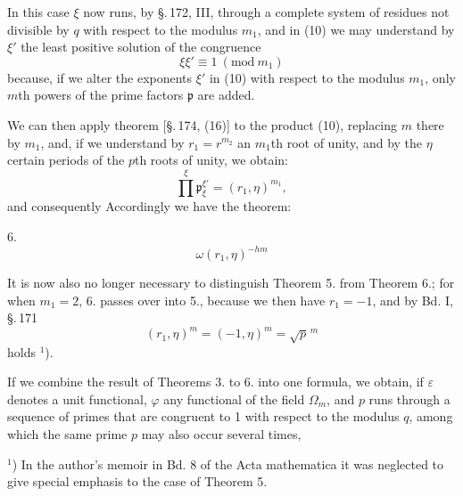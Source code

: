 
In this case $\xi$ now runs, by \S.\,172, III, through a complete
system of residues not divisible by $q$ with respect to the modulus
$m_1$, and in (10) we may understand by $\xi'$ the least positive
solution of the congruence
\[
\xi\xi' \equiv 1\ (\mathrm{mod}\ m_1)
\]
because, if we alter the exponents $\xi'$ in (10) with respect to the
modulus $m_1$, only $m$th powers of the prime factors $\mathfrak{p}$
are added.

We can then apply  theorem [\S.\,174, (16)] to
the product (10), replacing $m$ there by $m_1$, and, if we understand
by $r_1 = r^{m_2}$ an $m_1$th root of unity, and by the $\eta$ %
certain periods of the $p$th roots of unity, we obtain:
\[
\prod^{\xi} \mathfrak{p}_\xi^{\xi'} = (r_1, \eta)^{m_1},
\]
and consequently
Accordingly we have the theorem:

6. 
\[
\omega (r_1, \eta)^{-hm}
\]

It is now also no longer necessary to distinguish Theorem 5. from
Theorem 6.; for when $m_1 = 2$, 6. passes over into 5., because we
then have $r_1 = -1$, and by Bd. I, \S.\,171
\[
(r_1, \eta)^m = (-1, \eta)^m = \sqrt{p}^{\,m}
\]
holds $^1$).

If we combine the result of Theorems 3. to 6. into one formula, we
obtain, if $\varepsilon$ denotes a unit functional, $\varphi$ any
functional of the field $\Omega_m$, and $p$ runs through a sequence
of primes that are congruent to 1 with respect to the modulus $q$,
among which the same prime $p$ may also occur several times,

\noindent
$^1$) In the author's memoir in Bd. 8 of the Acta mathematica it was
neglected to give special emphasis to the case of Theorem 5.
